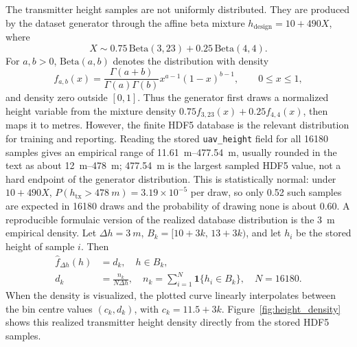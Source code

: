 The transmitter height samples are not uniformly distributed. They are produced
by the dataset generator through the affine beta mixture
\(h_{\mathrm{design}}=10+490X\), where
\begin{equation}
X\sim 0.75\,\mathrm{Beta}(3,23)+0.25\,\mathrm{Beta}(4,4).
\label{eq:height_beta_mixture}
\end{equation}
For \(a,b>0\), \(\mathrm{Beta}(a,b)\) denotes the distribution with density
\begin{equation}
  f_{a,b}(x)=
  \frac{\Gamma(a+b)}{\Gamma(a)\Gamma(b)}
  x^{a-1}(1-x)^{b-1},\qquad 0\le x\le 1,
  \label{eq:beta_density}
\end{equation}
and density zero outside \([0,1]\). Thus the generator first draws a normalized
height variable from the mixture density
\(0.75 f_{3,23}(x)+0.25 f_{4,4}(x)\), then maps it to metres.
However, the finite HDF5 database is the relevant distribution for training
and reporting. Reading the stored \texttt{uav\_height} field for all 16180
samples gives an empirical range of \SIrange{11.61}{477.54}{m}, usually
rounded in the text as about \SIrange{12}{478}{m}; \SI{477.54}{m} is the
largest sampled HDF5 value, not a hard endpoint of the generator distribution.
This is statistically normal: under \(10+490X\),
\(P(h_{\mathrm{tx}}>\SI{478}{m})=3.19\times10^{-5}\) per draw, so only
0.52 such samples are expected in 16180 draws and the probability of drawing
none is about 0.60. A reproducible formulaic version of the realized database
distribution is the \SI{3}{m} empirical density. Let \(\Delta h=\SI{3}{m}\),
\(B_k=[10+3k,\,13+3k)\), and let \(h_i\) be the stored height of
sample \(i\). Then
\begin{equation}
  \begin{aligned}
  \hat f_{\Delta h}(h) &= d_k,\quad h\in B_k,\\
  d_k &= \frac{n_k}{N\Delta h},\quad
  n_k=\sum_{i=1}^{N}\mathbf{1}\{h_i\in B_k\},\quad N=16180 .
  \end{aligned}
  \label{eq:height_empirical_histogram}
\end{equation}
When the density is visualized, the plotted curve linearly interpolates
between the bin centre values \((c_k,d_k)\), with \(c_k=11.5+3k\).
Figure~\ref{fig:height_density} shows this realized transmitter height density
directly from the stored HDF5 samples.

